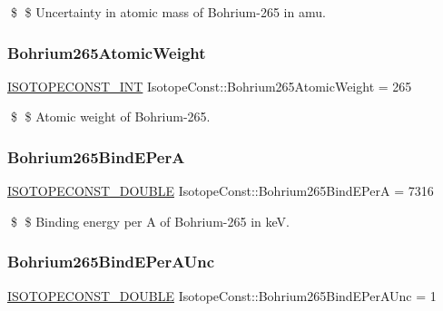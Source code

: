 \$ \$ Uncertainty in atomic mass of Bohrium-\/265 in amu. \mbox{\label{group___isotope_const-_bohrium-_bh265_ga16f6d2c28d9c8aaa3a7f19f1e4f369c1}} 
\subsubsection{\texorpdfstring{Bohrium265\+Atomic\+Weight}{Bohrium265AtomicWeight}}
{\footnotesize\ttfamily \mbox{\hyperlink{group___isotope_const-_macros_ga5f18360b3e99483a35c32d789e62621c}{I\+S\+O\+T\+O\+P\+E\+C\+O\+N\+S\+T\+\_\+\+I\+NT}} Isotope\+Const\+::\+Bohrium265\+Atomic\+Weight = 265}

\$ \$ Atomic weight of Bohrium-\/265. \mbox{\label{group___isotope_const-_bohrium-_bh265_gaacf5ff20950f408c9220b832b090061b}} 
\subsubsection{\texorpdfstring{Bohrium265\+Bind\+E\+PerA}{Bohrium265BindEPerA}}
{\footnotesize\ttfamily \mbox{\hyperlink{group___isotope_const-_macros_ga8f45a7272ce02c0b4c65c44636ed719a}{I\+S\+O\+T\+O\+P\+E\+C\+O\+N\+S\+T\+\_\+\+D\+O\+U\+B\+LE}} Isotope\+Const\+::\+Bohrium265\+Bind\+E\+PerA = 7316}

\$ \$ Binding energy per A of Bohrium-\/265 in keV. \mbox{\label{group___isotope_const-_bohrium-_bh265_ga2547cd22347f5927275f7bee4efb9f5f}} 
\subsubsection{\texorpdfstring{Bohrium265\+Bind\+E\+Per\+A\+Unc}{Bohrium265BindEPerAUnc}}
{\footnotesize\ttfamily \mbox{\hyperlink{group___isotope_const-_macros_ga8f45a7272ce02c0b4c65c44636ed719a}{I\+S\+O\+T\+O\+P\+E\+C\+O\+N\+S\+T\+\_\+\+D\+O\+U\+B\+LE}} Isotope\+Const\+::\+Bohrium265\+Bind\+E\+Per\+A\+Unc = 1}

